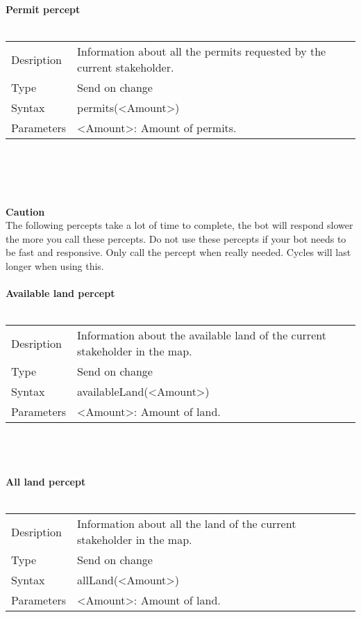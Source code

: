 \documentclass[english,11pt]{report}
\begin{document}
\textbf{Permit percept}\\
\\
\begin{tabularx}{\textwidth}{lX}
 Desription & Information about all the permits requested by the current stakeholder. \\
 Type & Send on change \\
 Syntax & permits(<Amount>) \\
 Parameters &   <Amount>: Amount of permits.
\end{tabularx}\\
\\
\\
\\
\textbf{Caution}\\
The following percepts take a lot of time to complete, the bot will respond slower the more you call these percepts. Do not use these percepts if your bot needs to be fast and responsive. Only call the percept when really needed. Cycles will last longer when using this.
\\
\\
\textbf{Available land percept}\\
\\
\begin{tabularx}{\textwidth}{lX}
 Desription & Information about the available land of the current stakeholder in the map. \\
 Type & Send on change \\
 Syntax & availableLand(<Amount>) \\
 Parameters &   <Amount>: Amount of land.
\end{tabularx}\\
\\
\\
\textbf{All land percept}\\
\\
\begin{tabularx}{\textwidth}{lX}
 Desription & Information about all the land of the current stakeholder in the map. \\
 Type & Send on change \\
 Syntax & allLand(<Amount>) \\
 Parameters &   <Amount>: Amount of land.
\end{tabularx}\\
\\
\\


\end{document}
